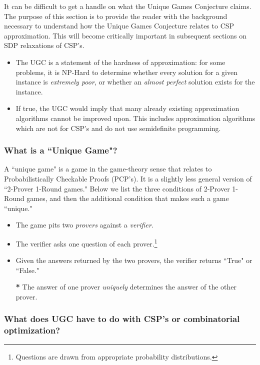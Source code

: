 It can be difficult to get a handle on what the Unique Games Conjecture claims. 
The purpose of this section is to provide the reader with the background necessary to understand how the Unique Games Conjecture relates to CSP approximation. 
This will become critically important in subsequent sections on SDP relaxations of CSP's.

\begin{itemize}
\item The UGC is a statement of the hardness of approximation: 
for some problems, it is NP-Hard to determine whether every solution for a given instance is \textit{extremely poor}, or whether an \textit{almost perfect} solution exists for the instance.
\item If true, the UGC would imply that many already existing approximation algorithms cannot be improved upon. 
This includes approximation algorithms which are not for CSP's and do not use semidefinite programming.
\end{itemize}

\subsubsection{What is a ``Unique Game"?}

A ``unique game" is a game in the game-theory sense that relates to Probabilistically Checkable Proofs (PCP's). 
It is a slightly less general version of ``2-Prover 1-Round games." 
Below we list the three conditions of 2-Prover 1-Round games, and then the additional condition that makes such a game ``unique."
\begin{itemize}
\item The game pits two \textit{provers} against a \textit{verifier}.
\item The verifier asks one question of each prover.\footnote{Questions are drawn from appropriate probability distributions.}
\item Given the answers returned by the two provers, the verifier returns ``True" or ``False."
\item[\textbf{*}] The answer of one prover \textit{uniquely} determines the answer of the other prover.
\end{itemize}

\subsubsection{What does UGC have to do with CSP's or combinatorial optimization?}

